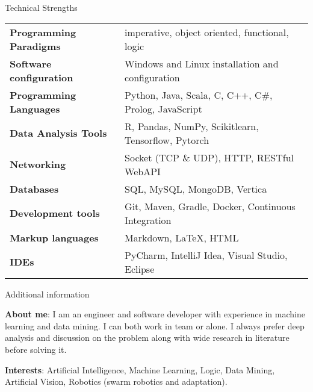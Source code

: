 \documentclass{resume} %
\begin{document}
    
    \begin{rSection}{Technical Strengths}
        \begin{tabular}{ @{} >{\bfseries}l @{\hspace{6ex}} l }
            Programming Paradigms	& imperative, object oriented, functional, logic\\
            Software configuration 	& Windows and Linux installation and configuration\\
            Programming Languages 	& Python, Java, Scala, C, C++, C\#, Prolog, JavaScript\\
            Data Analysis Tools		& R, Pandas, NumPy, Scikitlearn, Tensorflow, Pytorch\\
            Networking 				& Socket (TCP \& UDP), HTTP, RESTful WebAPI \\
            Databases 				& SQL, MySQL, MongoDB, Vertica \\
            Development tools 		& Git, Maven, Gradle, Docker, Continuous Integration \\
            Markup languages 		& Markdown, \LaTeX, HTML\\
            IDEs 					& PyCharm, IntelliJ Idea, Visual Studio, Eclipse
        \end{tabular}						
    \end{rSection}
    
    
    
    \begin{rSection}{Additional information}
        
        \item \textbf{About me}: I am an engineer and software developer with experience in machine learning and data mining. I can both work in team or alone. I always prefer deep analysis and discussion on the problem along with wide research in literature before solving it.
        
        \item \textbf{Interests}: Artificial Intelligence, Machine Learning, Logic, Data Mining, Artificial Vision, Robotics (swarm robotics and adaptation).
        
    \end{rSection}
    
\end{document}
